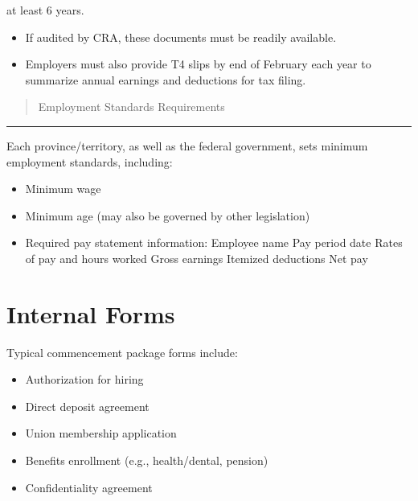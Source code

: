 \documentclass[letterpaper,10pt,english]{sphinxmanual}
\begin{document}
\sphinxAtStartPar
at least 6 years.
\begin{itemize}
\item {} 
\sphinxAtStartPar
If audited by CRA, these documents must be readily available.

\item {} 
\sphinxAtStartPar
Employers must also provide T4 slips by end of February each year to summarize annual earnings and deductions for tax filing.

\end{itemize}
\begin{quote}

\sphinxAtStartPar
Employment Standards Requirements
\end{quote}


\bigskip\hrule\bigskip


\sphinxAtStartPar
Each province/territory, as well as the federal government, sets minimum employment standards, including:
\begin{itemize}
\item {} 
\sphinxAtStartPar
Minimum wage

\item {} 
\sphinxAtStartPar
Minimum age (may also be governed by other legislation)

\item {} 
\sphinxAtStartPar
Required pay statement information:
\sphinxhyphen{} Employee name
\sphinxhyphen{} Pay period date
\sphinxhyphen{} Rates of pay and hours worked
\sphinxhyphen{} Gross earnings
\sphinxhyphen{} Itemized deductions
\sphinxhyphen{} Net pay

\end{itemize}


\section{Internal Forms}
\label{\detokenize{onboarding_employee:internal-forms}}
\sphinxAtStartPar
Typical commencement package forms include:
\begin{itemize}
\item {} 
\sphinxAtStartPar
Authorization for hiring

\item {} 
\sphinxAtStartPar
Direct deposit agreement

\item {} 
\sphinxAtStartPar
Union membership application

\item {} 
\sphinxAtStartPar
Benefits enrollment (e.g., health/dental, pension)

\item {} 
\sphinxAtStartPar
Confidentiality agreement

\end{itemize}
\end{document}
